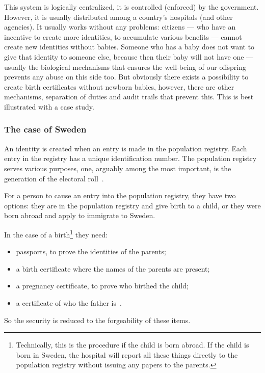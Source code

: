 This system is logically centralized, it is controlled (enforced) by the 
government.
However, it is usually distributed among a country's hospitals (and other 
agencies).
It usually works without any problems: citizens --- who have an incentive to 
create more identities, \eg to accumulate various benefits --- cannot create 
new identities without babies.
Someone who has a baby does not want to give that identity to someone else, 
because then their baby will not have one --- usually the biological mechanisms 
that ensures the well-being of our offspring prevents any abuse on this side 
too.
But obviously there exists a possibility to create birth certificates without 
newborn babies, however, there are other mechanisms, \eg separation of duties 
and audit trails that prevent this.
This is best illustrated with a case study.

\subsubsection{The case of Sweden}

An identity is created when an entry is made in the population registry.
Each entry in the registry has a unique identification number.
The population registry serves various purposes, one, arguably among the most 
important, is the generation of the electoral 
roll~\cite{Valmyndigheten-ElectoralRoll}.

For a person to cause an entry into the population registry, they have two 
options:
they are in the population registry and give birth to a child, or
they were born abroad and apply to immigrate to Sweden.

In the case of a birth\footnote{%
  Technically, this is the procedure if the child is born abroad.
  If the child is born in Sweden, the hospital will report all these things 
  directly to the population registry without issuing any papers to the 
  parents.
} they need:
\begin{itemize}
  \item passports, to prove the identities of the parents;
  \item a birth certificate where the names of the parents are present;
  \item a pregnancy certificate, to prove who birthed the child;
  \item a certificate of who the father is~\cite{Skatteverket-RegisterBirth}.
\end{itemize}
So the security is reduced to the forgeability of these items.

